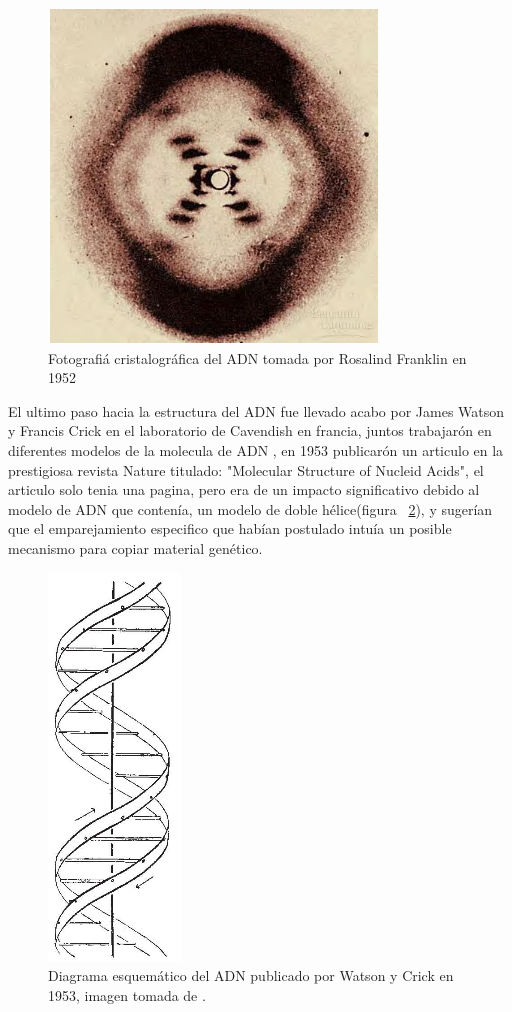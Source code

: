 \begin{figure}[htbp]
    \centering
    \includegraphics[width=0.5\linewidth]{./Figures/RF.png}
    \caption[Fotografía cristalográfica del ADN]{Fotografiá cristalográfica del ADN tomada por Rosalind Franklin en 1952}
    \label{fig:rf}
\end{figure}
El ultimo paso hacia la estructura del ADN fue llevado acabo por James Watson y Francis Crick en el laboratorio de Cavendish en francia, juntos trabajarón en diferentes modelos de la molecula de ADN , en 1953 publicarón un articulo en la prestigiosa revista Nature titulado: "Molecular Structure of Nucleid Acids", el articulo solo tenia una pagina, pero era de un impacto significativo debido al modelo de ADN que contenía, un modelo de doble hélice(figura ~\ref{fig:jw}), y sugerían que el emparejamiento  especifico que habían postulado intuía un posible mecanismo para copiar material genético.
\begin{figure}[htbp]
    \centering
    \includegraphics[width=0.15\linewidth]{./Figures/DNA1.png}
    \caption[Diagrama esquemático del ADN]{Diagrama esquemático del ADN publicado por Watson y Crick en 1953, imagen tomada de \cite{jwfc}.}
    \label{fig:jw}
\end{figure}

